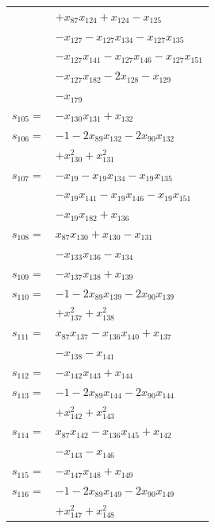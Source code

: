 \begin{longtable}{@{}r@{\;}l@{}}
 & \(\displaystyle +x_{87}x_{124} +x_{124} -x_{125}\) \\
 & \(\displaystyle -x_{127} -x_{127}x_{134} -x_{127}x_{135}\) \\
 & \(\displaystyle -x_{127}x_{141} -x_{127}x_{146} -x_{127}x_{151}\) \\
 & \(\displaystyle -x_{127}x_{182} -2x_{128} -x_{129}\) \\
 & \(\displaystyle -x_{179}\) \\[3pt]
\(s_{105}=\) & \(\displaystyle -x_{130}x_{131} +x_{132}\) \\[3pt]
\(s_{106}=\) & \(\displaystyle -1 -2x_{89}x_{132} -2x_{90}x_{132}\) \\
 & \(\displaystyle +x_{130}^{2} +x_{131}^{2}\) \\[3pt]
\(s_{107}=\) & \(\displaystyle -x_{19} -x_{19}x_{134} -x_{19}x_{135}\) \\
 & \(\displaystyle -x_{19}x_{141} -x_{19}x_{146} -x_{19}x_{151}\) \\
 & \(\displaystyle -x_{19}x_{182} +x_{136}\) \\[3pt]
\(s_{108}=\) & \(\displaystyle x_{87}x_{130} +x_{130} -x_{131}\) \\
 & \(\displaystyle -x_{133}x_{136} -x_{134}\) \\[3pt]
\(s_{109}=\) & \(\displaystyle -x_{137}x_{138} +x_{139}\) \\[3pt]
\(s_{110}=\) & \(\displaystyle -1 -2x_{89}x_{139} -2x_{90}x_{139}\) \\
 & \(\displaystyle +x_{137}^{2} +x_{138}^{2}\) \\[3pt]
\(s_{111}=\) & \(\displaystyle x_{87}x_{137} -x_{136}x_{140} +x_{137}\) \\
 & \(\displaystyle -x_{138} -x_{141}\) \\[3pt]
\(s_{112}=\) & \(\displaystyle -x_{142}x_{143} +x_{144}\) \\[3pt]
\(s_{113}=\) & \(\displaystyle -1 -2x_{89}x_{144} -2x_{90}x_{144}\) \\
 & \(\displaystyle +x_{142}^{2} +x_{143}^{2}\) \\[3pt]
\(s_{114}=\) & \(\displaystyle x_{87}x_{142} -x_{136}x_{145} +x_{142}\) \\
 & \(\displaystyle -x_{143} -x_{146}\) \\[3pt]
\(s_{115}=\) & \(\displaystyle -x_{147}x_{148} +x_{149}\) \\[3pt]
\(s_{116}=\) & \(\displaystyle -1 -2x_{89}x_{149} -2x_{90}x_{149}\) \\
 & \(\displaystyle +x_{147}^{2} +x_{148}^{2}\) \\[3pt]

\end{longtable}
